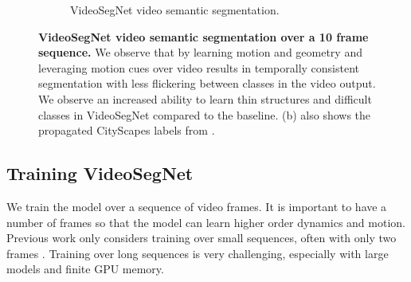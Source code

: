 \begin{figure}[p]
\begin{subfigure}[t]{\linewidth}
\begin{center}
  \caption{VideoSegNet video semantic segmentation.}
\end{center}
\end{subfigure}
   \caption[VideoSegNet video semantic segmentation over a 10 frame sequence.]{\textbf{VideoSegNet video semantic segmentation over a 10 frame sequence.} We observe that by learning motion and geometry and leveraging motion cues over video results in temporally consistent segmentation with less flickering between classes in the video output. We observe an increased ability to learn thin structures and difficult classes in VideoSegNet compared to the baseline. (b) also shows the propagated CityScapes labels from \citep{budvytis2017large,budvytis2010label}.}
\label{fig:results_seq}
\clearpage
\end{figure}

\subsection{Training VideoSegNet}

We train the model over a sequence of video frames. It is important to have a number of frames so that the model can learn higher order dynamics and motion. Previous work only considers training over small sequences, often with only two frames \citep{gadde2017semantic}. Training over long sequences is very challenging, especially with large models and finite GPU memory. 

